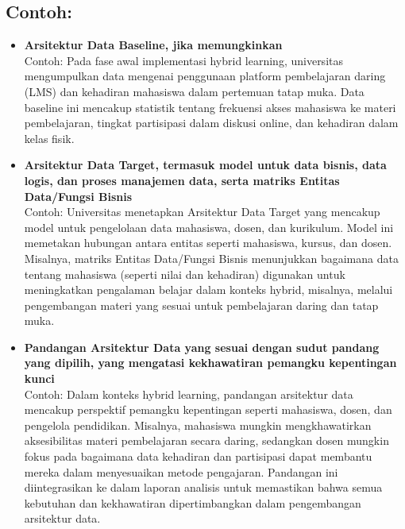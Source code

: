 \subsection*{Contoh:}
\begin{itemize}
	\item \textbf{Arsitektur Data Baseline, jika memungkinkan} \\
	Contoh: Pada fase awal implementasi hybrid learning, universitas mengumpulkan data mengenai penggunaan platform pembelajaran daring (LMS) dan kehadiran mahasiswa dalam pertemuan tatap muka. Data baseline ini mencakup statistik tentang frekuensi akses mahasiswa ke materi pembelajaran, tingkat partisipasi dalam diskusi online, dan kehadiran dalam kelas fisik. 
	
	\item \textbf{Arsitektur Data Target, termasuk model untuk data bisnis, data logis, dan proses manajemen data, serta matriks Entitas Data/Fungsi Bisnis} \\
	Contoh: Universitas menetapkan Arsitektur Data Target yang mencakup model untuk pengelolaan data mahasiswa, dosen, dan kurikulum. Model ini memetakan hubungan antara entitas seperti mahasiswa, kursus, dan dosen. Misalnya, matriks Entitas Data/Fungsi Bisnis menunjukkan bagaimana data tentang mahasiswa (seperti nilai dan kehadiran) digunakan untuk meningkatkan pengalaman belajar dalam konteks hybrid, misalnya, melalui pengembangan materi yang sesuai untuk pembelajaran daring dan tatap muka.
	
	\item \textbf{Pandangan Arsitektur Data yang sesuai dengan sudut pandang yang dipilih, yang mengatasi kekhawatiran pemangku kepentingan kunci} \\
	Contoh: Dalam konteks hybrid learning, pandangan arsitektur data mencakup perspektif pemangku kepentingan seperti mahasiswa, dosen, dan pengelola pendidikan. Misalnya, mahasiswa mungkin mengkhawatirkan aksesibilitas materi pembelajaran secara daring, sedangkan dosen mungkin fokus pada bagaimana data kehadiran dan partisipasi dapat membantu mereka dalam menyesuaikan metode pengajaran. Pandangan ini diintegrasikan ke dalam laporan analisis untuk memastikan bahwa semua kebutuhan dan kekhawatiran dipertimbangkan dalam pengembangan arsitektur data.
\end{itemize}


